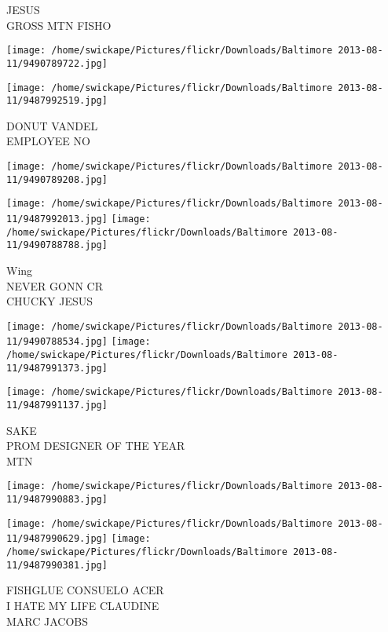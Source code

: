 \documentclass[10pt,letterpaper]{article}
\begin{document}
JESUS\\
GROSS MTN FISHO\\
\pagebreak

\texttt{[image: /home/swickape/Pictures/flickr/Downloads/Baltimore 2013-08-11/9490789722.jpg]}

\vspace{0.25in}
\texttt{[image: /home/swickape/Pictures/flickr/Downloads/Baltimore 2013-08-11/9487992519.jpg]}

DONUT VANDEL\\
EMPLOYEE NO\\
\pagebreak

\texttt{[image: /home/swickape/Pictures/flickr/Downloads/Baltimore 2013-08-11/9490789208.jpg]}

\vspace{0.25in}
\texttt{[image: /home/swickape/Pictures/flickr/Downloads/Baltimore 2013-08-11/9487992013.jpg]}
\texttt{[image: /home/swickape/Pictures/flickr/Downloads/Baltimore 2013-08-11/9490788788.jpg]}

Wing\\
NEVER GONN CR\\
CHUCKY JESUS\\
\pagebreak

\texttt{[image: /home/swickape/Pictures/flickr/Downloads/Baltimore 2013-08-11/9490788534.jpg]}
\texttt{[image: /home/swickape/Pictures/flickr/Downloads/Baltimore 2013-08-11/9487991373.jpg]}

\texttt{[image: /home/swickape/Pictures/flickr/Downloads/Baltimore 2013-08-11/9487991137.jpg]}

SAKE\\
PROM DESIGNER OF THE YEAR\\
MTN\\
\pagebreak

\texttt{[image: /home/swickape/Pictures/flickr/Downloads/Baltimore 2013-08-11/9487990883.jpg]}

\vspace{0.25in}
\texttt{[image: /home/swickape/Pictures/flickr/Downloads/Baltimore 2013-08-11/9487990629.jpg]}
\texttt{[image: /home/swickape/Pictures/flickr/Downloads/Baltimore 2013-08-11/9487990381.jpg]}

FISHGLUE CONSUELO ACER\\
I HATE MY LIFE CLAUDINE\\
MARC JACOBS\\
\pagebreak
\end{document}
